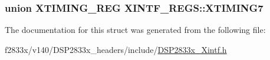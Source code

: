 \subsubsection[{X\+T\+I\+M\+I\+N\+G7}]{\setlength{\rightskip}{0pt plus 5cm}union {\bf X\+T\+I\+M\+I\+N\+G\+\_\+\+R\+E\+G} X\+I\+N\+T\+F\+\_\+\+R\+E\+G\+S\+::\+X\+T\+I\+M\+I\+N\+G7}\label{struct_x_i_n_t_f___r_e_g_s_a69e67c437ce8b32823659b4208954b36}


The documentation for this struct was generated from the following file\+:\begin{DoxyCompactItemize}
\item 
f2833x/v140/\+D\+S\+P2833x\+\_\+headers/include/\hyperlink{_d_s_p2833x___xintf_8h}{D\+S\+P2833x\+\_\+\+Xintf.\+h}\end{DoxyCompactItemize}
